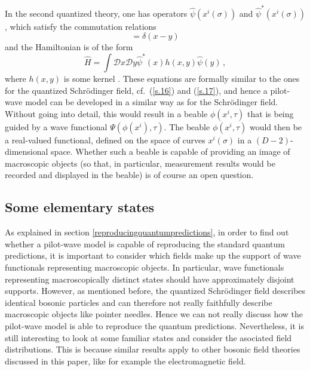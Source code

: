 \documentclass[12pt]{article}
\begin{document}
In the second quantized theory, one has operators ${\widehat \psi}(x^i(\sigma)) $ and ${\widehat \psi}^*(x^i(\sigma))$, which satisfy the commutation relations
\begin{equation}
[{\widehat \psi}(x),{\widehat \psi}^*(y )] = \delta(x - y) 
\label{s.18.5}
\end{equation}
and the Hamiltonian is of the form
\begin{equation}
{\widehat H} = \int {\mathcal D} x {\mathcal D} y {\widehat \psi}^*(x) h(x,y) {\widehat \psi}(y)\,,
\label{s.18.6}
\end{equation}
where $h(x,y)$ is some kernel \cite{weingard95}. These equations are formally similar to the ones for the quantized Schr{\"o}\-ding\-er field, cf.\ (\ref{s.16}) and (\ref{s.17}), and hence a pilot-wave model can be developed in a similar way as for the Schr{\"o}\-ding\-er field. Without going into detail, this would result in a beable $\phi(x^i,\tau)$ that is being guided by a wave functional $\Psi(\phi(x^i),\tau)$. The beable $\phi(x^i,\tau)$ would then be a real-valued functional, defined on the space of curves $x^i(\sigma)$ in a $(D-2)$-dimensional space. Whether such a beable is capable of providing an image of macroscopic objects (so that, in particular, measurement results would be recorded and displayed in the beable) is of course an open question.



\subsection{Some elementary states}\label{someelementarystates}
As explained in section \ref{reproducingquantumpredictions}, in order to find out whether a pilot-wave model is capable of reproducing the standard quantum predictions, it is important to consider which fields make up the support of wave functionals representing macroscopic objects. In particular, wave functionals representing macroscopically distinct states should have approximately disjoint supports. However, as mentioned before, the quantized Schr{\"o}\-ding\-er field describes identical bosonic particles and can therefore not really faithfully describe macroscopic objects like pointer needles. Hence we can not really discuss how the pilot-wave model is able to reproduce the quantum predictions. Nevertheless, it is still interesting to look at some familiar states and consider the asociated field distributions. This is because similar results apply to other bosonic field theories discussed in this paper, like for example the electromagnetic field.
\end{document}
